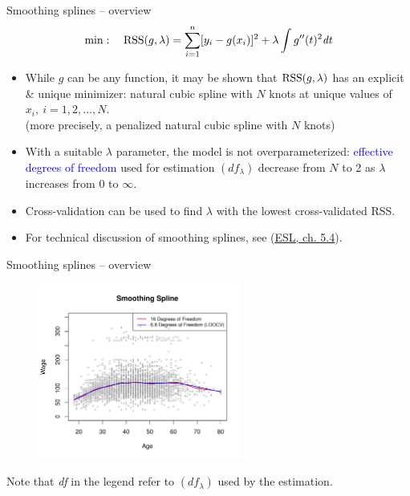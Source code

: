 \documentclass{beamer}
\begin{document}
\begin{frame}{Smoothing splines -- overview}
$$\min:~~~\textnormal{RSS}(g,\lambda) = \sum_{i=1}^n [y_i - g(x_i)]^2 + \lambda \int g''(t)^2 \textit{dt}$$
\begin{itemize}
    \item While $g$ can be any function, it may be shown that $\textnormal{RSS}(g,\lambda)$ has an explicit \& unique minimizer: natural cubic spline with $N$ knots at unique values of $x_i,~i=1,2,\dots,N$. \\(more precisely, a penalized natural cubic spline with $N$ knots)
    \medskip
    \item With a suitable $\lambda$ parameter, the model is not overparameterized: \textcolor{blue}{effective degrees of freedom} used for estimation $(df_{\lambda})$ decrease from $N$ to 2 as $\lambda$ increases from 0 to $\infty$.
    \medskip
    \item Cross-validation can be used to find $\lambda$ with the lowest cross-validated RSS.
    \medskip
    \item For technical discussion of smoothing splines, see (\textcolor{blue}{\underline{\href{https://web.stanford.edu/~hastie/ElemStatLearn/}{ESL, ch. 5.4}}}).
\end{itemize}
\end{frame}
\begin{frame}{Smoothing splines -- overview}
\vspace{-0.4cm}
\begin{figure}
  \centering
  \includegraphics[trim=0cm 0cm 0cm 1cm, clip=true, width=0.6\textwidth]{IMG/ISLR78.pdf}
\end{figure}
\centering
\vspace{-0.5cm}
\tiny{Note that \textit{df} in the legend refer to $(df_{\lambda})$ used by the estimation.}
\end{frame}
\end{document}
